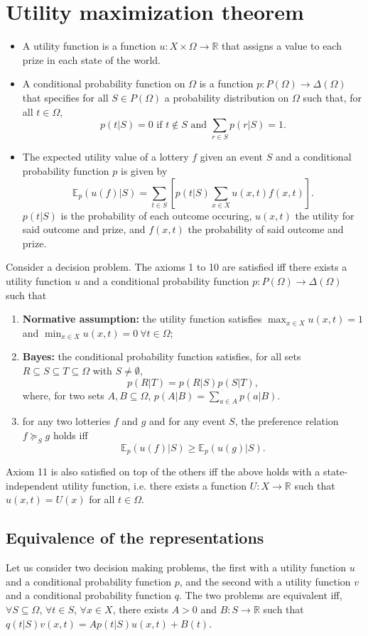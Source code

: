 \documentclass[12pt, openany]{report}
\newcommand{\R}{\mathbb{R}}
\newcommand{\E}{\mathbb{E}}
\theoremstyle{definition}
\begin{document}
\section{Utility maximization theorem}
\begin{itemize}
	\item A utility function is a function $u:X\times \Omega\to \R$ that assigns a value to each prize in each state of the world. 
	\item A conditional probability function on $\Omega$ is a function $p:P(\Omega)\to \Delta(\Omega)$ that specifies for all $S\in P(\Omega)$ a probability distribution on $\Omega$ such that, for all $t\in\Omega$, \[p(t|S)=0 \text{ if }t\not \in S\text{ and } \sum_{r\in S}p(r|S)=1.\]
	\item The expected utility value of a lottery $f$ given an event $S$ and a conditional probability function $p$ is given by \[\E_p(u(f)|S)=\sum_{t\in S}\left[p(t|S)\sum_{x\in X}u(x,t)f(x,t)\right].\]
	$p(t|S)$ is the probability of each outcome occuring, $u(x,t)$ the utility for said outcome and prize, and $f(x,t)$ the probability of said outcome and prize. 
\end{itemize}
Consider a decision problem. The axioms 1 to 10 are satisfied iff there exists a utility function $u$ and a conditional probability function $p:P(\Omega)\to \Delta(\Omega)$ such that 
\begin{enumerate}
	\item \textbf{Normative assumption:} the utility function satisfies $\displaystyle \max_{x\in X}u(x,t)=1$ and $\displaystyle \min_{x\in X}u(x,t)=0 \ \forall t\in \Omega$;
	\item \textbf{Bayes:} the conditional probability function satisfies, for all sets $R\subseteq S\subseteq T\subseteq \Omega$ with $S\neq \emptyset$,\[p(R|T)=p(R|S)p(S|T),\] where, for two sets $A,B\subseteq \Omega$, $p(A|B)=\sum_{a\in A}p(a|B)$.
	\item for any two lotteries $f$ and $g$ and for any event $S$, the preference relation $f\succcurlyeq_S g$ holds iff \[\E_p(u(f)|S)\ge \E_p(u(g)|S).\]
\end{enumerate}
Axiom 11 is also satisfied on top of the others iff the above holds with a state-independent utility function, i.e. there exists a function $U:X\rightarrow \R$ such that $u(x,t)=U(x)$ for all $t\in \Omega$.
\subsection{Equivalence of the representations}
Let us consider two decision making problems, the first with a utility function $u$ and a conditional probability function $p$, and the second with a utility function $v$ and a conditional probability function $q$. The two problems are equivalent iff, $\forall S\subseteq \Omega$, $\forall t\in S$, $\forall x\in X$, there exists $A>0$ and $B:S\to\R$ such that $q(t|S)v(x,t) = Ap(t|S)u(x,t)+B(t)$. 
\end{document}
